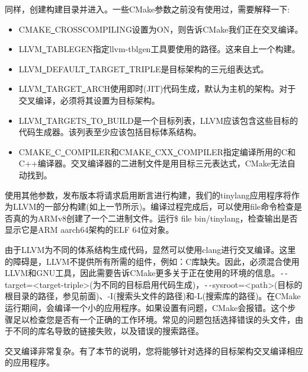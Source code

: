 同样，创建构建目录并进入。一些CMake参数之前没有使用过，需要解释一下:\par

\begin{itemize}
\item CMAKE\underline{~}CROSSCOMPILING设置为ON，则告诉CMake我们正在交叉编译。
\item LLVM\underline{~}TABLEGEN指定llvm-tblgen工具要使用的路径。这来自上一个构建。
\item LLVM\underline{~}DEFAULT\underline{~}TARGET\underline{~}TRIPLE是目标架构的三元组表达式。
\item LLVM\underline{~}TARGET\underline{~}ARCH使用即时(JIT)代码生成，默认为主机的架构。对于交叉编译，必须将其设置为目标架构。
\item LLVM\underline{~}TARGETS\underline{~}TO\underline{~}BUILD是一个目标列表，LLVM应该包含这些目标的代码生成器。该列表至少应该包括目标体系结构。
\item CMAKE\underline{~}C\underline{~}COMPILER和CMAKE\underline{~}CXX\underline{~}COMPILER指定编译所用的C和C++编译器。交叉编译器的二进制文件是用目标三元表达式，CMake无法自动找到。
\end{itemize}

使用其他参数，发布版本将请求启用断言进行构建，我们的tinylang应用程序将作为LLVM的一部分构建(如上一节所示)。编译过程完成后，可以使用file命令检查是否真的为ARMv8创建了一个二进制文件。运行\$ file bin/tinylang，检查输出是否显示它是ARM aarch64架构的ELF 64位对象。\par

\begin{tcolorbox}[colback=blue!5!white,colframe=blue!75!black, title=使用clang进行交叉编译]
由于LLVM为不同的体系结构生成代码，显然可以使用clang进行交叉编译。这里的障碍是，LLVM不提供所有所需的组件，例如：C库缺失。因此，必须混合使用LLVM和GNU工具，因此需要告诉CMake更多关于正在使用的环境的信息。\verb|--|target=<target-triple>(为不同的目标启用代码生成)，\verb|--|sysroot=<path>(目标的根目录的路径，参见前面)、-I(搜索头文件的路径)和-L(搜索库的路径)。在CMake运行期间，会编译一个小的应用程序。如果设置有问题，CMake会报错。这个步骤足以检查您是否有一个正确的工作环境。常见的问题包括选择错误的头文件，由于不同的库名导致的链接失败，以及错误的搜索路径。
\end{tcolorbox}

交叉编译非常复杂。有了本节的说明，您将能够针对选择的目标架构交叉编译相应的应用程序。\par































